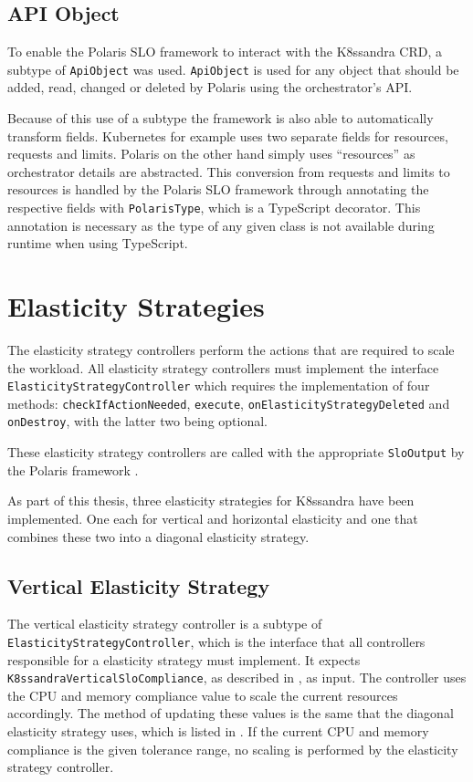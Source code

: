\subsection{API Object}

To enable the Polaris SLO framework to interact with the K8ssandra CRD, a subtype of \texttt{ApiObject} was used. \texttt{ApiObject} is used for any object that should be added, read, changed or deleted by Polaris using the orchestrator's API.

Because of this use of a subtype the framework is also able to automatically transform fields. Kubernetes for example uses two separate fields for resources, requests and limits. Polaris on the other hand simply uses ``resources'' as orchestrator details are abstracted. This conversion from requests and limits to resources is handled by the Polaris SLO framework through annotating the respective fields with \texttt{PolarisType}, which is a TypeScript decorator. This annotation is necessary as the type of any given class is not available during runtime when using TypeScript.

\section{Elasticity Strategies}

The elasticity strategy controllers perform the actions that are required to scale the workload. All elasticity strategy controllers must implement the interface \texttt{Elasticity\-Strategy\-Controller} which requires the implementation of four methods: \texttt{check\-If\-Action\-Needed}, \texttt{execute}, \texttt{on\-Elasticity\-Strategy\-Deleted} and \texttt{on\-Destroy}, with the latter two being optional.

These elasticity strategy controllers are called with the appropriate \texttt{SloOutput} by the Polaris framework \cite{pusztaiNovelMiddlewareEfficiently2021a}.

As part of this thesis, three elasticity strategies for K8ssandra have been implemented. One each for vertical and horizontal elasticity and one that combines these two into a diagonal elasticity strategy.

\subsection{Vertical Elasticity Strategy}
\label{sec:vertical-elasticity}

The vertical elasticity strategy controller is a subtype of \texttt{Elasticity\-Strategy\-Controller}, which is the interface that all controllers responsible for a elasticity strategy must implement. It expects \texttt{K8ssandra\-Vertical\-Slo\-Compliance}, as described in , as input. The controller uses the CPU and memory compliance value to scale the current resources accordingly. The method of updating these values is the same that the diagonal elasticity strategy uses, which is listed in . If the current CPU and memory compliance is the given tolerance range, no scaling is performed by the elasticity strategy controller.

